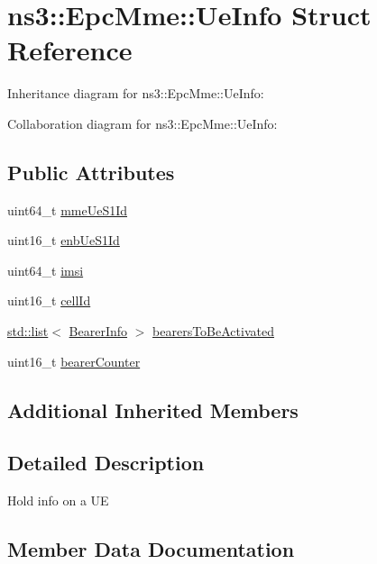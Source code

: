\hypertarget{structns3_1_1EpcMme_1_1UeInfo}{}\section{ns3\+:\+:Epc\+Mme\+:\+:Ue\+Info Struct Reference}
\label{structns3_1_1EpcMme_1_1UeInfo}


Inheritance diagram for ns3\+:\+:Epc\+Mme\+:\+:Ue\+Info\+:


Collaboration diagram for ns3\+:\+:Epc\+Mme\+:\+:Ue\+Info\+:
\subsection*{Public Attributes}
\begin{DoxyCompactItemize}
\item 
uint64\+\_\+t \hyperlink{structns3_1_1EpcMme_1_1UeInfo_a04d3d3298a0ef216b7dd5bed9622dc46}{mme\+Ue\+S1\+Id}
\item 
uint16\+\_\+t \hyperlink{structns3_1_1EpcMme_1_1UeInfo_a6327526f36e31388c4d662c2486d3c66}{enb\+Ue\+S1\+Id}
\item 
uint64\+\_\+t \hyperlink{structns3_1_1EpcMme_1_1UeInfo_a361611ef13ada4ca3f13c065bfe155d2}{imsi}
\item 
uint16\+\_\+t \hyperlink{structns3_1_1EpcMme_1_1UeInfo_ab4bca9040e83c46b8160c4ff90546915}{cell\+Id}
\item 
\hyperlink{openflow-interface_8h_afd9bcfa176617760671b67580f536fa7}{std\+::list}$<$ \hyperlink{structns3_1_1EpcMme_1_1BearerInfo}{Bearer\+Info} $>$ \hyperlink{structns3_1_1EpcMme_1_1UeInfo_a8347e339cef2ce88e49e538852fce355}{bearers\+To\+Be\+Activated}
\item 
uint16\+\_\+t \hyperlink{structns3_1_1EpcMme_1_1UeInfo_a45943ca87596abce54013417ceba1457}{bearer\+Counter}
\end{DoxyCompactItemize}
\subsection*{Additional Inherited Members}


\subsection{Detailed Description}
Hold info on a UE 

\subsection{Member Data Documentation}
